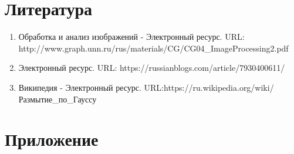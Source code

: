 \documentclass{report}
\begin{document}
\newpage

\section*{Литература}
\begin{enumerate}
\item Обработка и анализ изображений - Электронный ресурс. \newline URL: http://www.graph.unn.ru/rus/materials/CG/CG04_ImageProcessing2.pdf
\item Электронный ресурс.  \newline URL: https://russianblogs.com/article/7930400611/
\item Википедия - Электронный ресурс. \newline URL:https://ru.wikipedia.org/wiki/Размытие_по_Гауссу
\end{enumerate} 
\newpage

\section*{Приложение}
\end{document}
